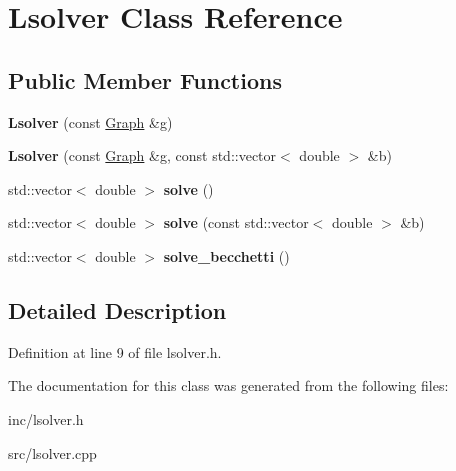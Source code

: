 \hypertarget{classLsolver}{}\section{Lsolver Class Reference}
\label{classLsolver}
\subsection*{Public Member Functions}
\begin{DoxyCompactItemize}
\item 
\mbox{\label{classLsolver_a87fe3dd0b3ccb177aff4866f33d4ad2e}} 
{\bfseries Lsolver} (const \hyperlink{classGraph}{Graph} \&g)
\item 
\mbox{\label{classLsolver_ad821a531324d3905a5e72035c9f61994}} 
{\bfseries Lsolver} (const \hyperlink{classGraph}{Graph} \&g, const std\+::vector$<$ double $>$ \&b)
\item 
\mbox{\label{classLsolver_aa6b28d7d78ff0e7230ece53676b6061e}} 
std\+::vector$<$ double $>$ {\bfseries solve} ()
\item 
\mbox{\label{classLsolver_a842e092b26dd9c98a78265a2ba5c351d}} 
std\+::vector$<$ double $>$ {\bfseries solve} (const std\+::vector$<$ double $>$ \&b)
\item 
\mbox{\label{classLsolver_a81745754f3025c2b4f3691d61fdfd862}} 
std\+::vector$<$ double $>$ {\bfseries solve\+\_\+becchetti} ()
\end{DoxyCompactItemize}


\subsection{Detailed Description}


Definition at line 9 of file lsolver.\+h.



The documentation for this class was generated from the following files\+:\begin{DoxyCompactItemize}
\item 
inc/lsolver.\+h\item 
src/lsolver.\+cpp\end{DoxyCompactItemize}
